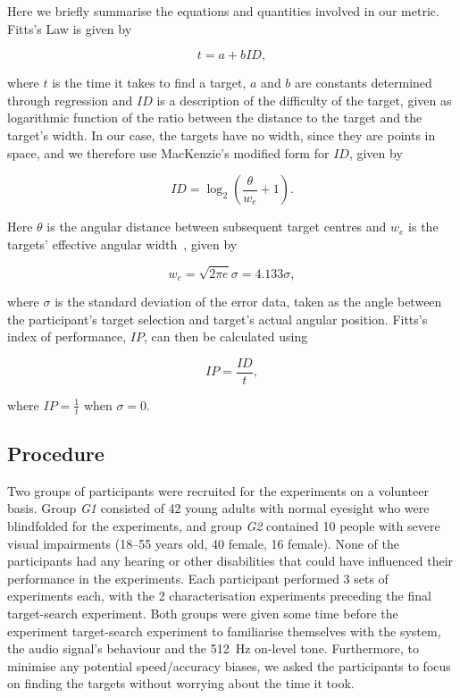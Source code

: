 \documentclass{article}
\begin{document}
Here we briefly summarise the equations and quantities involved in our metric.
Fitts's Law is given by  

\begin{equation}
  \label{eq:fitts-base}
  t = a + bID,
\end{equation}

\noindent
where $t$ is the time it takes to find a target, $a$ and $b$ are constants determined through regression and $ID$ is a description of the difficulty of the target, given as logarithmic function of the ratio between the distance to the target and the target's width.
In our case, the targets have no width, since they are points in space, and we therefore use MacKenzie's modified form for $ID$, given by

\begin{equation}
  \label{eq:fitts-id}
  ID = \log_2\left(\frac{\theta}{w_e} + 1\right).
\end{equation}

\noindent
Here $\theta$ is the angular distance between subsequent target centres and $w_e$ is the targets' effective angular width~\cite{welford1968fundamentals}, given by

\begin{equation}
  \label{eq:fitts-we}
  w_e = \sqrt{2\pi e}\sigma = 4.133\sigma,
\end{equation}

\noindent
where $\sigma$ is the standard deviation of the error data, taken as the angle between the participant's target selection and target's actual angular position.
Fitts's index of performance, $IP$, can then be calculated using 

\begin{equation}
  \label{eq:fitts-performance}
  IP = \frac{ID}{t},
\end{equation}

\noindent
where $IP = \frac{1}{t}$ when $\sigma=0$.

\subsection{Procedure}

Two groups of participants were recruited for the experiments on a volunteer basis. 
Group \textit{G1} consisted of 42 young adults with normal eyesight who were blindfolded for the experiments, and group \textit{G2} contained 10 people with severe visual impairments (18--55 years old, 40 female, 16 female). 
None of the participants had any hearing or other disabilities that could have influenced their performance in the experiments.
Each participant performed 3 sets of experiments each, with the 2 characterisation experiments preceding the final target-search experiment. 
Both groups were given some time before the experiment target-search experiment to familiarise themselves with the system, the audio signal's behaviour and the \SI{512}{\hertz} on-level tone. 
Furthermore, to minimise any potential speed/accuracy biases, we asked the participants to focus on finding the targets without worrying about the time it took. 
\end{document}
